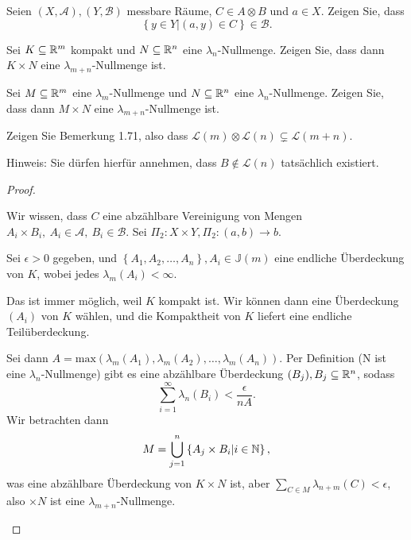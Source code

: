 \begin{Problem}
	\begin{parts}
		\item Seien $(X,\mathcal{A}), (Y,\mathcal{B})$ messbare R\"{a}ume, $C\in A\otimes B$ und $a\in X$. Zeigen Sie, dass
			\[
			\left\{ y\in Y|(a,y)\in C \right\} \in \mathcal{B}
			.\] 
		\item Sei $K\subseteq \mathbb{R}^m$ kompakt und $N\subseteq \mathbb{R}^n$ eine $\lambda_n$-Nullmenge. Zeigen Sie, dass dann $K\times N$ eine $\lambda_{m+n}$-Nullmenge ist.
		\item Sei $M\subseteq \mathbb{R}^m$ eine $\lambda_m$-Nullmenge und $N\subseteq \mathbb{R}^n$ eine $\lambda_n$-Nullmenge. Zeigen Sie, dass dann $M \times N$ eine $\lambda_{m+n}$-Nullmenge ist.
		\item Zeigen Sie Bemerkung 1.71, also dass $\mathcal{L}(m)\otimes \mathcal{L}(n)\subsetneq \mathcal{L}(m+n)$.

			{\footnotesize Hinweis: Sie dürfen hierfür annehmen, dass $B\not\in \mathcal{L}(n)$ tatsächlich existiert.}
	\end{parts}
\end{Problem}
\begin{proof}
	\begin{parts}
	\item Wir wissen, dass $C$ eine abzählbare Vereinigung von Mengen $A_i\times B_i,~A_i\in \mathcal{A},~B_i\in \mathcal{B}$. Sei $\Pi_2: X \times Y, \Pi_2:(a,b)\to b$. 
	\item Sei $\epsilon>0$ gegeben, und $\left\{ A_1,A_2,\dots,A_n \right\},A_i\in\mathbb{J}(m)$ eine endliche Überdeckung von $K$, wobei jedes $\lambda_m(A_i)<\infty$. 
		\begin{tcolorbox}
			Das ist immer möglich, weil $K$ kompakt ist. Wir können dann eine Überdeckung $(A_i)$ von $K$ wählen, und die Kompaktheit von $K$ liefert eine endliche Teilüberdeckung. 
		\end{tcolorbox}
		Sei dann $A=\text{max}\left( \lambda_m(A_1),\lambda_m(A_2),\dots, \lambda_m(A_n) \right)$. Per Definition (N ist eine $\lambda_n$-Nullmenge) gibt es eine abzählbare Überdeckung $(B_j),B_j\subseteq \mathbb{R}^n$, sodass
		 \[
		\sum_{i=1}^{\infty} \lambda_n(B_i)<\frac{\epsilon}{nA}
		.\] 
		Wir betrachten dann
		\[
		M=\bigcup_{j=1}^n\left\{ A_j\times B_i|i\in \mathbb{N} \right\}  
		,\]
		was eine abzählbare Überdeckung von $K\times N$ ist, aber $\sum_{C\in M}\lambda_{n+m}(C)<\epsilon$, also $\times N$ ist eine $\lambda_{m+n}$-Nullmenge.
	\end{parts}
\end{proof}
